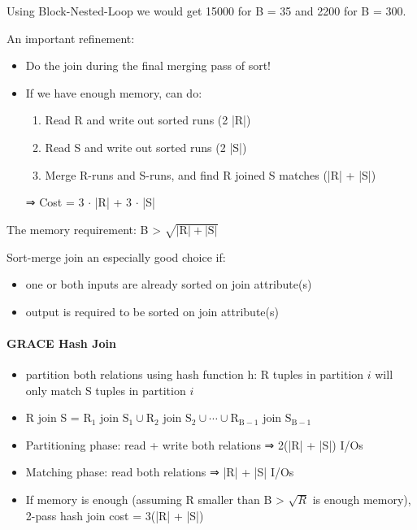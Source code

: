 Using Block-Nested-Loop we would get 15000 for B = 35 and
2200 for B = 300.



An important refinement:
\begin{itemize}
\item Do the join during the final merging pass of sort!
\item If we have enough memory, can do:
  \begin{enumerate}
  \item Read R and write out sorted runs (2 |R|)
  \item Read S and write out sorted runs (2 |S|)
  \item Merge R-runs and S-runs, and find R joined S matches
    (|R| + |S|)
  \end{enumerate}

⇒ Cost = 3 $\cdot$ |R| + 3 $\cdot$ |S|
\end{itemize}

The memory requirement: B > $\sqrt{|\text{R}| + |\text{S}|}$

Sort-merge join an especially good choice if:
\begin{itemize}
\item one or both inputs are already sorted on join attribute(s)
\item output is required to be sorted on join attribute(s)
\end{itemize}


\paragraph{GRACE Hash Join}
\begin{itemize}
\item partition both relations using hash function h:
  R tuples in partition $i$ will only match S tuples in
  partition $i$
\item R join S = $\text{R}_1$ join $\text{S}_1 \cup \text{R}_2$
  join $\text{S}_2 \cup \cdots \cup \text{R}_{\text{B}-1}$ join
  $\text{S}_{\text{B}-1}$
\end{itemize}

\begin{itemize}
\item Partitioning phase:
  read + write both relations
  ⇒ 2(|R| + |S|) I/Os

\item Matching phase:
  read both relations
  ⇒ |R| + |S| I/Os

\item If memory is enough (assuming R smaller than B > $\sqrt{R}$ is
  enough memory),
  2-pass hash join cost = 3(|R| + |S|)
\end{itemize}


